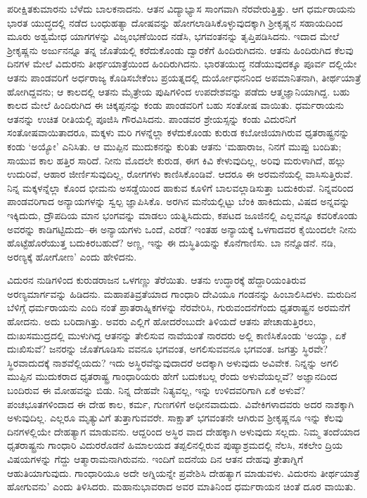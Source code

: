 ಪರೀಕ್ಷಿತಕುಮಾರನು ಬೆಳೆದು ಬಾಲಕನಾದನು. ಆತನ ವಿದ್ಯಾಭ್ಯಾಸ ಸಾಂಗವಾಗಿ ನೆರವೇರುತ್ತಿತ್ತು. ಆಗ ಧರ್ಮರಾಯನು ಭಾರತ ಯುದ್ಧದಲ್ಲಿ ನಡೆದ ಬಂಧುಹತ್ಯಾ ದೋಷವನ್ನು ಹೋಗಲಾಡಿಸಿಕೊಳ್ಳುವುದಕ್ಕಾಗಿ ಶ್ರೀಕೃಷ್ಣನ ಸಹಾಯದಿಂದ ಮೂರು ಅಶ್ವಮೇಧ ಯಾಗಗಳನ್ನು ವಿಜೃಂಭಣೆಯಿಂದ ನಡೆಸಿ, ಭಗವಂತನನ್ನು ತೃಪ್ತಿಪಡಿಸಿದನು. ಇದಾದ ಮೇಲೆ ಶ್ರೀಕೃಷ್ಣನು ಅರ್ಜುನನ್ನೂ ತನ್ನ ಜೊತೆಯಲ್ಲಿ ಕರೆದುಕೊಂಡು ದ್ವಾರಕೆಗೆ ಹಿಂದಿರುಗಿದನು. ಆತನು ಹಿಂದಿರುಗಿದ ಕೆಲವು ದಿನಗಳ ಮೇಲೆ ವಿದುರನು ತೀರ್ಥಯಾತ್ರೆಯಿಂದ ಹಿಂದಿರುಗಿದನು. ಭಾರತಯುದ್ಧ ನಡೆಯುವುದಕ್ಕೂ ಪೂರ್ವ ದಲ್ಲಿಯೇ ಆತನು ಪಾಂಡವರಿಗೆ ಅರ್ಧರಾಜ್ಯ ಕೊಡಿಸಬೇಕೆಂಬ ಪ್ರಯತ್ನದಲ್ಲಿ ದುರ್ಯೋಧನನಿಂದ ಅಪಮಾನಿತನಾಗಿ, ತೀರ್ಥಯಾತ್ರೆ ಹೋಗಿದ್ದವನು; ಆ ಕಾಲದಲ್ಲಿ ಆತನು ಮೈತ್ರೇಯ ಪುಷಿಗಳಿಂದ ಉಪದೇಶವನ್ನು ಪಡೆದು ಆತ್ಮಜ್ಞಾನಿಯಾಗಿದ್ದ. ಬಹು ಕಾಲದ ಮೇಲೆ ಹಿಂದಿರುಗಿದ ಈ ಚಿಕ್ಕಪ್ಪನನ್ನು ಕಂಡು ಪಾಂಡವರಿಗೆ ಬಹು ಸಂತೋಷ ವಾಯಿತು. ಧರ್ಮರಾಯನು ಆತನನ್ನು ಉಚಿತ ರೀತಿಯಲ್ಲಿ ಪೂಜಿಸಿ ಗೌರವಿಸಿದನು. ಪಾಂಡವರ ಶ್ರೇಯಸ್ಸನ್ನು ಕಂಡು ವಿದುರನಿಗೆ ಸಂತೋಷವಾಯಿತಾದರೂ, ಮಕ್ಕಳು ಮರಿ ಗಳನ್ನೆಲ್ಲಾ ಕಳೆದುಕೊಂಡು ಕುರುಡ ಕಬೋಜಿಯಾಗಿರುವ ಧೃತರಾಷ್ಟ್ರನನ್ನು ಕಂಡು ‘ಅಯ್ಯೋ’ ಎನಿಸಿತು. ಆ ಮುಪ್ಪಿನ ಮುದುಕನನ್ನು ಕುರಿತು ಆತನು ‘ಮಹಾರಾಜ, ನಿನಗೆ ಮುಪ್ಪು ಬಂದಿತು; ಸಾಯುವ ಕಾಲ ಹತ್ತಿರ ಸಾರಿದೆ. ನೀನು ಮೊದಲೇ ಕುರುಡ, ಈಗ ಕಿವಿ ಕೇಳುವುದಿಲ್ಲ, ಅರಿವು ಮರುಳಾಗಿದೆ, ಹಲ್ಲು ಉದುರಿವೆ, ಆಹಾರ ಜೀರ್ಣಿಸುವುದಿಲ್ಲ, ರೋಗಗಳು ಕಾಣಿಸಿಕೊಂಡಿವೆ. ಆದರೂ ಈ ಅರಮನೆಯಲ್ಲಿ ವಾಸಿಸುತ್ತಿರುವೆ. ನಿನ್ನ ಮಕ್ಕಳನ್ನೆಲ್ಲಾ ಕೊಂದ ಭೀಮನು ಅಸಡ್ಡೆಯಿಂದ ಹಾಕುವ ಕೂಳಿಗೆ ಬಾಲವಲ್ಲಾಡಿಸುತ್ತಾ ಬದುಕಿರುವೆ. ನಿನ್ನವರಿಂದ ಪಾಂಡವರಿಗಾದ ಅನ್ಯಾಯಗಳನ್ನು ಸ್ವಲ್ಪ ಜ್ಞಾಪಿಸಿಕೊ. ಅರಗಿನ ಮನೆಯಲ್ಲಿಟ್ಟು ಬೆಂಕಿ ಹಾಕಿದುದು, ವಿಷದ ಅನ್ನವನ್ನು ಇಕ್ಕಿದುದು, ದ್ರೌಪದಿಯ ಮಾನ ಭಂಗವನ್ನು ಮಾಡಲು ಯತ್ನಿಸಿದುದು, ಕಪಟದ ಜೂಜಿನಲ್ಲಿ ಎಲ್ಲವನ್ನೂ ಕವರಿಕೊಂಡು ಅವರನ್ನು ಕಾಡಿಗಟ್ಟಿದುದು–ಈ ಅನ್ಯಾಯಗಳು ಒಂದೆ, ಎರಡೆ? ಇಂತಹ ಅನ್ಯಾಯಕ್ಕೆ ಒಳಗಾದವರ ಕೈಯಿಂದಲೇ ನೀನು ಹೊಟ್ಟೆಹೊರೆಯುತ್ತ ಬದುಕಿರಬಹುದೆ? ಅಣ್ಣ, ಇನ್ನು ಈ ದುಸ್ಥಿತಿಯನ್ನು ಕೊನೆಗಾಣಿಸು. ಬಾ ನನ್ನೊಡನೆ. ನಡಿ, ಅರಣ್ಯಕ್ಕೆ ಹೋಗೋಣ’ ಎಂದು ಹೇಳಿದನು.

ವಿದುರನ ನುಡಿಗಳಿಂದ ಕುರುಡರಾಜನ ಒಳಗಣ್ಣು ತೆರೆಯಿತು. ಆತನು ಉದ್ಧಾರಕ್ಕೆ ಹೆದ್ದಾರಿಯಂತಿರುವ ಅರಣ್ಯಮಾರ್ಗವನ್ನು ಹಿಡಿದನು. ಮಹಾಪತಿವ್ರತೆಯಾದ ಗಾಂಧಾರಿ ದೇವಿಯೂ ಗಂಡನನ್ನು ಹಿಂಬಾಲಿಸಿದಳು. ಮರುದಿನ ಬೆಳಿಗ್ಗೆ ಧರ್ಮರಾಯನು ಎಂದಿ ನಂತೆ ಪ್ರಾತರಾಹ್ನಿಕಗಳನ್ನು ನೆರವೇರಿಸಿ, ಗುರುವಂದನೆಗೆಂದು ಧೃತರಾಷ್ಟ್ರನ ಅರಮನೆಗೆ ಹೋದನು. ಅದು ಬರಿದಾಗಿತ್ತು. ಅವರು ಎಲ್ಲಿಗೆ ಹೋದರೆಂಬುದೇ ತಿಳಿಯದೆ ಆತನು ಪೇಚಾಡುತ್ತಿರಲು, ದುಃಖಸಮುದ್ರದಲ್ಲಿ ಮುಳುಗಿದ್ದ ಆತನನ್ನು ತೇಲಿಸುವ ನಾವೆಯಂತೆ ನಾರದರು ಅಲ್ಲಿ ಕಾಣಿಸಿಕೊಂಡು ‘ಅಯ್ಯಾ, ಏಕೆ ದುಃಖಿಸುವೆ? ಜನರನ್ನು ಜೊತೆಗೂಡಿಸು ವವನೂ ಭಗವಂತ, ಅಗಲಿಸುವವನೂ ಭಗವಂತ. ಜಗತ್ತು ಸ್ಥಿರವೇ? ಸ್ಥಿರವಾದುದಕ್ಕೆ ನಾಶವೆಲ್ಲಿಯದು? ಇದು ಅಸ್ಥಿರವೆನ್ನುವುದಾದರೆ ಅದಕ್ಕಾಗಿ ಅಳುವುದು ಅವಿವೇಕ. ನಿನ್ನನ್ನು ಅಗಲಿ ಮುಪ್ಪಿನ ಮುದುಕರಾದ ಧೃತರಾಷ್ಟ್ರ ಗಾಂಧಾರಿಯರು ಹೇಗೆ ಬದುಕಬಲ್ಲ ರೆಂದು ಅಳುವೆಯಲ್ಲವೆ? ಅಜ್ಞಾನದಿಂದ ಬಂದಿರುವ ಈ ಮೋಹವನ್ನು ಬಿಡು. ನಿನ್ನ ದೇಹವೇ ನಿತ್ಯವಲ್ಲ, ಇನ್ನು ಉಳಿದವರಿಗಾಗಿ ಏಕೆ ಅಳುವೆ? ಪಂಚಭೂತಗಳಿಂದಾದ ಈ ದೇಹ ಕಾಲ, ಕರ್ಮ, ಗುಣಗಳಿಗೆ ಅಧೀನವಾದುದು. ವಿವೇಕಿಗಳಾದವರು ಅದರ ನಾಶಕ್ಕಾಗಿ ಅಳುವುದಿಲ್ಲ. ಎಲ್ಲರೂ ಮೃತ್ಯುವಿಗೆ ತುತ್ತಾಗುವವರೇ. ಸಾಕ್ಷಾತ್ ಭಗವಂತನೇ ಆಗಿರುವ ಶ್ರೀಕೃಷ್ಣನೂ ಇನ್ನು ಕೆಲವು ದಿನಗಳಲ್ಲಿಯೇ ದೇಹತ್ಯಾಗ ಮಾಡುವನು. ಆದ್ದರಿಂದ ಅಸ್ಥಿರ ವಾದ ದೇಹಕ್ಕಾಗಿ ಅಳುವುದು ಸಲ್ಲದು. ನಿಮ್ಮ ತಂದೆಯಾದ ಧೃತರಾಷ್ಟ್ರನು ಗಾಂಧಾರಿ ವಿದುರರೊಡನೆ ಹಿಮಾಲಯದ ತಪ್ಪಲಿನಲ್ಲಿರುವ ಪುಷ್ಯಾಶ್ರಮದಲ್ಲಿ ನೆಲಸಿ, ಸಕಲೇಂ ದ್ರಿಯ ವಿಷಯಗಳನ್ನು ಗೆದ್ದು ಆತ್ಮಾರಾಮನಾಗಿರುವನು. ಇಂದಿಗೆ ಐದನೆಯ ದಿನ ಆತನ ದೇಹವು ತ್ರೇತಾಗ್ನಿಗೆ ಆಹುತಿಯಾಗುವುದು. ಗಾಂಧಾರಿಯೂ ಅದೇ ಅಗ್ನಿಯನ್ನೇ ಪ್ರವೇಶಿಸಿ ದೇಹತ್ಯಾಗ ಮಾಡುವಳು. ವಿದುರನು ತೀರ್ಥಯಾತ್ರೆ ಹೋಗುವನು’ ಎಂದು ತಿಳಿಸಿದರು. ಮಹಾನುಭಾವರಾದ ಅವರ ಮಾತಿನಿಂದ ಧರ್ಮರಾಯನ ಚಿಂತೆ ದೂರ ವಾಯಿತು.

